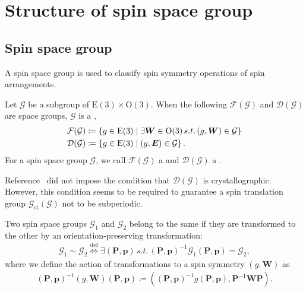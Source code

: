 \section{Structure of spin space group}

\subsection{Spin space group}

A spin space group \cite{doi:10.1063/1.1708514,doi:10.1098/rspa.1966.0211,LITVIN1974538,Opechowski1986} is used to classify spin symmetry operations of spin arrangements.

\begin{screen}
  \begin{definition}
    \label{def:spin_space_group}
    Let $\mathcal{G}$ be a subgroup of $\mathrm{E}(3) \times \mathrm{O}(3)$.
    When the following $\mathcal{F}(\mathcal{G})$ and $\mathcal{D}(\mathcal{G})$ are space groups, $\mathcal{G}$ is a  \cite{LITVIN1974538},
    \begin{align}
      \mathcal{F}(\mathcal{G})
        &\coloneqq \left\{  g \in \mathrm{E}(3)  \mathrel{}\middle|\mathrel{}  \exists \bm{W} \in \mathrm{O}(3) \,s.t.\, (g, \bm{W}) \in \mathcal{G}  \right\} \\
      \mathcal{D}(\mathcal{G})
        &\coloneqq \left\{  g \in \mathrm{E}(3)  \mathrel{}\middle|\mathrel{}  (g, \bm{E}) \in \mathcal{G}  \right\}.
    \end{align}
    For a spin space group $\mathcal{G}$, we call $\mathcal{F}(\mathcal{G})$ a  and $\mathcal{D}(\mathcal{G})$ a .
  \end{definition}
\end{screen}
Reference~\cite{LITVIN1974538} did not impose the condition that $\mathcal{D}(\mathcal{G})$ is crystallographic.
However, this condition seems to be required to guarantee a spin translation group $\mathcal{G}_{\mathrm{st}}(\mathcal{G})$ not to be subperiodic.

\begin{screen}
  \begin{definition}
    \label{def:spin_space_group_type}
    Two spin space groups $\mathcal{G}_{1}$ and $\mathcal{G}_{2}$ belong to the same  if they are transformed to the other by an orientation-preserving transformation:
    \begin{align}
      \mathcal{G}_{1} \sim \mathcal{G}_{2}
      \overset{\mathrm{def}}{\Longleftrightarrow}
      \exists (\bm{P}, \bm{p}) \,s.t.\, (\bm{P}, \bm{p})^{-1} \mathcal{G}_{1} (\bm{P}, \bm{p}) = \mathcal{G}_{2},
    \end{align}
    where we define the action of transformations to a spin symmetry $(g, \bm{W})$ as
    \begin{align}
      (\bm{P}, \bm{p})^{-1} (g, \bm{W}) (\bm{P}, \bm{p})
      \coloneqq
      ((\bm{P}, \bm{p})^{-1} g (\bm{P}, \bm{p}), \bm{P}^{-1}\bm{W}\bm{P}).
    \end{align}
  \end{definition}
\end{screen}

